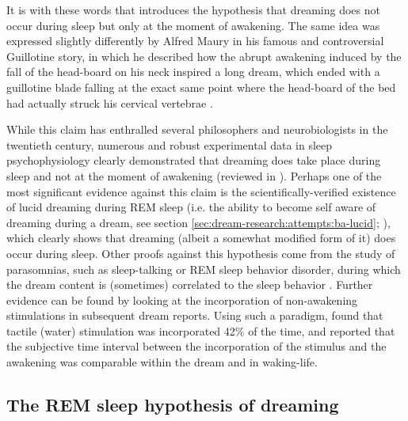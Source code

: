 It is with these words that \citet{goblot_souvenir_1896} introduces the hypothesis that dreaming does not occur during sleep but only at the moment of awakening. The same idea was expressed slightly differently by Alfred Maury in his famous and controversial Guillotine story, in which he described how the abrupt awakening induced by the fall of the head-board on his neck inspired a long dream, which ended with a guillotine blade falling at the exact same point where the head-board of the bed had actually struck his cervical vertebrae \citep{maury_sommeil_1865}.

While this claim has enthralled several philosophers and neurobiologists in the twentieth century, numerous and robust experimental data in sleep psychophysiology clearly demonstrated that dreaming does take place during sleep and not at the moment of awakening (reviewed in \citealp{guenole_reve_2010}). Perhaps one of the most significant evidence against this claim is the scientifically-verified existence of lucid dreaming during REM sleep (i.e. the ability to become self aware of dreaming during a dream, see section \ref{sec:dream-research:attempts:ba-lucid}; \citealp{laberge_exploring_1991, dresler_neural_2012}), which clearly shows that dreaming (albeit a somewhat modified form of it) does occur during sleep. Other proofs against this hypothesis come from the study of parasomnias, such as sleep-talking or REM sleep behavior disorder, during which the dream content is (sometimes) correlated to the sleep behavior \citep{ellman_mind_1991, schenck_rem_2002, leclair-visonneau_eyes_2010}. Further evidence can be found by looking at the incorporation of non-awakening stimulations in subsequent dream reports. Using such a paradigm, \citet{dement_relation_1958} found that tactile (water) stimulation was incorporated 42\% of the time, and reported that the subjective time interval between the incorporation of the stimulus and the awakening was comparable within the dream and in waking-life.

\subsection{The REM sleep hypothesis of dreaming}
\label{sec:dream-research:link:rem-sleep}

